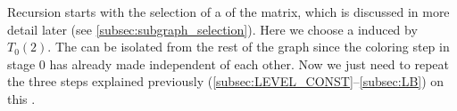 Recursion starts with the selection of a \subgraph of the matrix, which is discussed in more detail later (see \cref{subsec:subgraph_selection}). Here we choose a \subgraph induced by $T_0(2)$. The  \subgraph can be isolated from the rest of the graph since the \DONE coloring step in stage 0 has already made \levelGroups independent of each other. Now we just need to repeat the three steps explained previously (\cref{subsec:LEVEL_CONST}--\cref{subsec:LB}) on this \subgraph.
   
     \begin{figure}[thbp]
     	\centering
     	\hspace{2.25em}
     	\hspace{1.75em}
     	\hspace{1.75em}

\end{figure}
